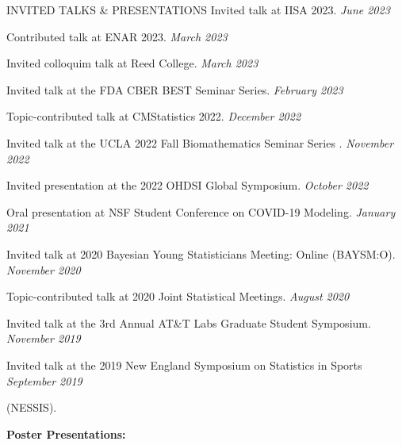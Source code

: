 \documentclass{resume} %
\begin{document}
\begin{rSection}{INVITED TALKS \& PRESENTATIONS}
	Invited talk at IISA 2023.  \hfill {\em June 2023}
	
	
	Contributed talk at ENAR 2023. \hfill {\em March 2023}
	
	Invited colloquim talk at Reed College. \hfill {\em March 2023}
	
	Invited talk at the FDA CBER BEST Seminar Series. \hfill {\em February 2023}
	
	Topic-contributed talk at CMStatistics 2022. \hfill {\em December 2022}
	
	Invited talk at the UCLA 2022 Fall Biomathematics Seminar Series . \hfill {\em November 2022}
	
	Invited presentation at the 2022 OHDSI Global Symposium.  \hfill {\em October 2022}
	
	{Oral presentation at NSF Student Conference on COVID-19 Modeling.} \hfill {\em January 2021}
	
	{Invited talk at 2020 Bayesian Young Statisticians Meeting: Online (BAYSM:O).} \hfill {\em November 2020}
	
	{Topic-contributed talk at 2020 Joint Statistical Meetings. } \hfill {\em August 2020}
	
	{Invited talk at the 3rd Annual AT\&T Labs Graduate Student Symposium.} \hfill {\em November 2019}
	
	
	{Invited talk at the 2019 New England Symposium on Statistics in Sports} \hfill {\em September 2019}
	
	\vspace{-0.1in}
	(NESSIS).
	
	
	
	
	
	\medskip
	\newpage
	
	\hspace*{-0.2in}\textbf{Poster Presentations:}
	

\end{rSection}
\end{document}
